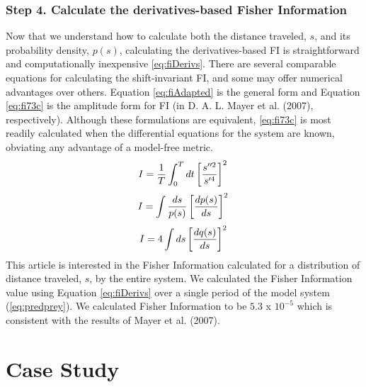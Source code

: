 \documentclass[12pt,twoside,openany]{reedthesis}
\begin{document}
\subsubsection{\texorpdfstring{\textbf{Step 4.} Calculate the
derivatives-based Fisher
Information}{Step 4. Calculate the derivatives-based Fisher Information}}\label{step-4.-calculate-the-derivatives-based-fisher-information}

Now that we understand how to calculate both the distance traveled,
\(s\), and its probability density, \(p(s)\), calculating the
derivatives-based FI is straightforward and computationally inexpensive
\eqref{eq:fiDerivs}. There are several comparable equations for
calculating the shift-invariant FI, and some may offer numerical
advantages over others. Equation \eqref{eq:fiAdapted} is the general form
and Equation \eqref{eq:fi73c} is the amplitude form for FI (in D. A. L.
Mayer et al. (2007), respectively). Although these formulations are
equivalent, \eqref{eq:fi73c} is most readily calculated when the
differential equations for the system are known, obviating any advantage
of a model-free metric.
\begin{equation}   
    I=\frac{1}{T}\int_0^Tdt\left[\frac{s''^2}{s'^4}\right]^2 \\  
  \label{eq:fiDerivs}  
\end{equation}
\begin{equation} 
    I = \int \frac{ds}{p(s)}\left[\frac{dp(s)}{ds}\right]^2  \\
    \label{eq:fiAdapted}
\end{equation}
\begin{equation} 
    I = 4 \int ds\left[\frac{dq(s)}{ds}\right]^2 \\
\label{eq:fi73c}
\end{equation}
This article is interested in the Fisher Information calculated for a
distribution of distance traveled, \(s\), by the entire system. We
calculated the Fisher Information value using Equation \eqref{eq:fiDerivs}
over a single period of the model system (\eqref{eq:predprey}). We
calculated Fisher Information to be \(5.3\) x \(10^{-5}\) which is
consistent with the results of Mayer et al. (2007).

\section{Case Study}\label{case-study}
\end{document}
